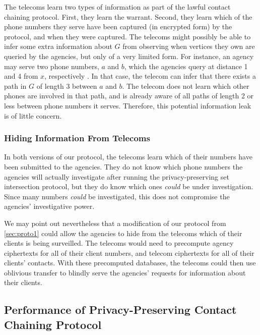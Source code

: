 The telecoms learn two types of information as part of the lawful contact chaining protocol. First, they learn the warrant. Second, they learn which of the phone numbers they serve have been captured (in encrypted form) by the protocol, and when they were captured. The telecoms might possibly be able to infer some extra information about $G$ from observing when vertices they own are queried by the agencies, but only of a very limited form. For instance, an agency may serve two phone numbers, $a$ and $b$, which the agencies query at distance 1 and 4 from $x$, respectively . In that case, the telecom can infer that there exists a path in $G$ of length 3 between $a$ and $b$. The telecom does not learn which other phones are involved in that path, and is already aware of all paths of length 2 or less between phone numbers it serves. Therefore, this potential information leak is of little concern.



\subsubsection{Hiding Information From Telecoms}

\label{sec:oblivious}



In both versions of our protocol, the telecoms learn which of their numbers have been submitted to the agencies. They do not know which phone numbers the agencies will actually investigate after running the privacy-preserving set intersection protocol, but they do know which ones \emph{could} be under investigation. Since many numbers \emph{could} be investigated, this does not compromise the agencies' investigative power.



We may point out nevertheless that a modification of our protocol from \ref{sec:proto1} could allow the agencies to hide from the telecoms which of their clients is being surveilled. The telecoms would need to precompute agency ciphertexts for all of their client numbers, and telecom ciphertexts for all of their clients' contacts. With these precomputed databases, the telecoms could then use oblivious transfer to blindly serve the agencies' requests for information about their clients.



\subsection{Performance of Privacy-Preserving Contact Chaining Protocol}

